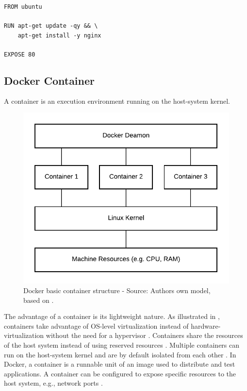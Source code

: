 \begin{lstlisting}[label=lst:04_docker_image_dockerfile, caption=Basic example of a Dockerfile]
FROM ubuntu

RUN apt-get update -qy && \
    apt-get install -y nginx

EXPOSE 80
\end{lstlisting}


\subsection{Docker Container}
A container is an execution environment running on the host-system kernel.

\begin{figure}[h]
\centering
\includegraphics[scale=1]{images/04_technical_background/docker/container_structure}
\caption{Docker basic container structure - Source: Authors own model, based on \cite{Bullington2020Docker}.}
\label{fig:04_docker_container_container-structure}
\end{figure}

The advantage of a container is its lightweight nature. As illustrated in , containers take advantage of OS-level virtualization instead of hardware-virtualization without the need for a hypervisor \cite{Docker2020Docs, Nickoloff2019Docker}. Containers share the resources of the host system instead of using reserved resources \cite{Bullington2020Docker}. Multiple containers can run on the host-system kernel and are by default isolated from each other \cite{Docker2020Docs}.
In Docker, a container is a runnable unit of an image used to distribute and test applications. A container can be configured to expose specific resources to the host system, e.g., network ports \cite{Bullington2020Docker}.


